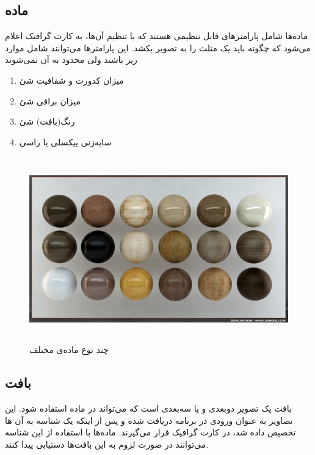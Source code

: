 \subsection{ماده 
\protect{}
}
ماده‌ها شامل پارامتر‌های قابل تنظیمی هستند که با تنظیم آن‌ها، به کارت گرافیک اعلام می‌شود که چگونه باید یک مثلث را به تصویر بکشد.
این پارامترها می‌توانند شامل موارد زیر باشند ولی محدود به آن نمی‌شوند

\begin{enumerate}
	\item میزان کدورت و شفافیت شئ
 	\item میزان براقی شئ
 	\item رنگ(بافت) شئ
 	\item سایه‌زنی پیکسلی یا راسی \protect{}
\end{enumerate}


\begin{figure}[ht]
	\centerline{\includegraphics[width=\textwidth,height=8cm,keepaspectratio]{Figures/Ch2/Material.png}}

	\caption{چند نوع ماده‌ی مختلف\cite{MaterialSource}}
	\label{fig:Material}
\end{figure}


\subsection{بافت
\protect{}
}
بافت یک تصویر دوبعدی و یا سه‌بعدی است که می‌تواند در ماده استفاده شود.
این تصاویر به عنوان ورودی در برنامه دریافت شده و پس از اینکه یک شناسه به آن ها تخصیص داده شد، در کارت گرافیک قرار می‌گیرند. ماده‌ها با استفاده از این شناسه می‌توانند در صورت لزوم به این بافت‌ها دستیابی پیدا کنند.


